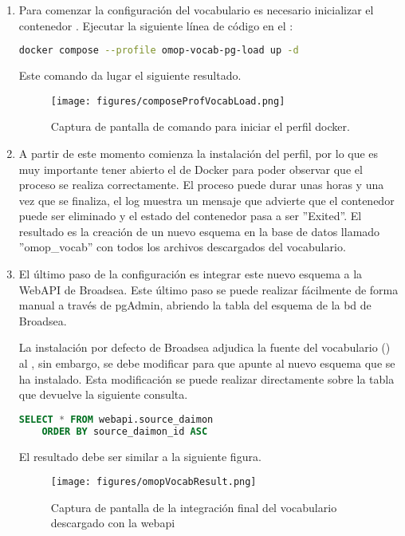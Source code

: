 \begin{enumerate}

    \item Para comenzar la configuración del vocabulario es necesario inicializar el contenedor . Ejecutar la siguiente línea de código en el :

    \begin{lstlisting}[language=sh]
    docker compose --profile omop-vocab-pg-load up -d\end{lstlisting}

    Este comando da lugar el siguiente resultado.

      \begin{figure}[H]
        \centering
        \texttt{[image: figures/composeProfVocabLoad.png]}
        \caption{Captura de pantalla de comando para iniciar el perfil docker.}
        \label{fig:composeProfVocabLoad}
    \end{figure}

    \item A partir de este momento comienza la instalación del perfil, por lo que es muy importante tener abierto el  de Docker para poder observar que el proceso se realiza correctamente. El proceso puede durar unas horas y una vez que se finaliza, el log muestra un mensaje que advierte que el contenedor puede ser eliminado y el estado del contenedor pasa a ser ''Exited''. El resultado es la creación de un nuevo esquema en la base de datos llamado ''omop\_vocab'' con todos los archivos descargados del vocabulario. 

    \item El último paso de la configuración es integrar este nuevo esquema a la WebAPI de Broadsea. Este último paso se puede realizar fácilmente de forma manual a través de pgAdmin, abriendo la tabla  del esquema  de la bd de Broadsea.

    La instalación por defecto de Broadsea adjudica la fuente del vocabulario () al , sin embargo, se debe modificar para que apunte al nuevo esquema  que se ha instalado. Esta modificación se puede realizar directamente sobre la tabla que devuelve la siguiente consulta.

    \begin{lstlisting}[language=sql]
    SELECT * FROM webapi.source_daimon
    ORDER BY source_daimon_id ASC \end{lstlisting}

    El resultado debe ser similar a la siguiente figura.

    \begin{figure}[H]
        \centering
        \texttt{[image: figures/omopVocabResult.png]}
        \caption{Captura de pantalla de la integración final del vocabulario descargado con la webapi}
        \label{fig:omopVocabResult}
    \end{figure}

\end{enumerate}

